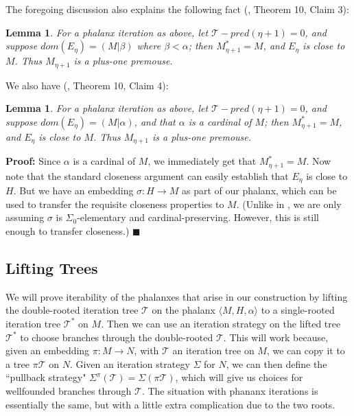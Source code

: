 \documentclass[12pt]{article}
\newtheorem{lem}[thm]{Lemma}
\begin{document}
The foregoing discussion also explains the following fact (\cite{FSPIPM}, Theorem 10, Claim 3):\\

\begin{lem}
For a phalanx iteration as above, let $\mathscr{T}-pred (\eta + 1 ) = 0$, and suppose $dom (E_\eta ) = (M | \beta )$ where $\beta < \alpha$; then $M_{\eta + 1}^* = M$, and $E_\eta$ is close to $M$.  Thus $M_{\eta + 1}$ is a plus-one premouse.
\end{lem}

We also have (\cite{FSPIPM}, Theorem 10, Claim 4):\\

\begin{lem}
For a phalanx iteration as above, let $\mathscr{T}-pred (\eta + 1 ) = 0$, and suppose $dom (E_\eta ) = (M | \alpha )$, and that $\alpha$ is a cardinal of $M$; then $M_{\eta + 1}^* = M$, and $E_\eta$ is close to $M$.  Thus $M_{\eta + 1}$ is a plus-one premouse.\end{lem}

\indent \indent \textbf{Proof:} Since $\alpha$ is a cardinal of $M$, we immediately get that $M_{\eta + 1}^* = M$.  Now note that the standard closeness argument can easily establish that $E_\eta$ is close to $H$.  But we have an embedding $\sigma : H \longrightarrow M$ as part of our phalanx, which can be used to transfer the requisite closeness properties to $M$.  (Unlike in \cite{FSPIPM}, we are only assuming $\sigma$ is $\Sigma_0$-elementary and cardinal-preserving.  However, this is still enough to transfer closeness.) $\blacksquare$\\

\subsection{Lifting Trees}

We will prove iterability of the phalanxes that arise in our construction by lifting the double-rooted iteration tree $\mathscr{T}$ on the phalanx $\langle M , H , \alpha \rangle$ to a single-rooted iteration tree $\mathscr{T}^*$ on $M$.  Then we can use an iteration strategy on the lifted tree $\mathscr{T}^*$ to choose branches through the double-rooted $\mathscr{T}$.  This will work because, given an embedding $\pi : M \longrightarrow N$, with $\mathscr{T}$ an iteration tree on $M$, we can copy it to a tree $\pi \mathscr{T}$ on $N$.  Given an iteration strategy $\Sigma$ for $N$, we can then define the ``pullback strategy" $\Sigma^{\pi} ( \mathscr{T}) = \Sigma ( \pi \mathscr{T})$, which will give us choices for wellfounded branches through $\mathscr{T}$.  The situation with phananx iterations is essentially the same, but with a little extra complication due to the two roots.\\
\end{document}
